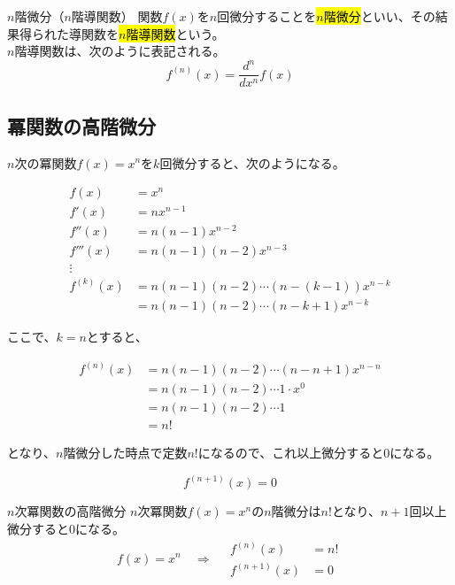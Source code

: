 \documentclass[../math-imaging]{subfiles}
\begin{document}
\begin{definition}{$n$階微分（$n$階導関数）}
  \newline
  関数$f(x)$を$n$回微分することを\hl{$n$階微分}といい、その結果得られた導関数を\hl{$n$階導関数}という。\\
  $n$階導関数は、次のように表記される。
  \LARGE
  \begin{equation}
    f^{(n)}(x) = \dfrac{d^n}{dx^n} f(x)
  \end{equation}
\end{definition}

\subsection{冪関数の高階微分}

$n$次の冪関数$f(x)=x^n$を$k$回微分すると、次のようになる。

\begin{align}
  f(x)       & = x^n                               \\
  f'(x)      & = nx^{n-1}                          \\
  f''(x)     & = n(n-1)x^{n-2}                     \\
  f'''(x)    & = n(n-1)(n-2)x^{n-3}                \\
  \vdots     &                                     \\
  f^{(k)}(x) & = n(n-1)(n-2)\cdots(n-(k-1))x^{n-k} \\
             & = n(n-1)(n-2)\cdots(n-k+1)x^{n-k}
\end{align}

ここで、$k=n$とすると、

\begin{align}
  f^{(n)}(x) & = n(n-1)(n-2)\cdots(n-n+1)x^{n-n} \\
             & = n(n-1)(n-2)\cdots 1 \cdot x^0   \\
             & = n(n-1)(n-2)\cdots 1             \\
             & = n!
\end{align}

となり、$n$階微分した時点で定数$n!$になるので、これ以上微分すると$0$になる。

\begin{equation}
  f^{(n+1)}(x) = 0
\end{equation}

\begin{theorem}{$n$次冪関数の高階微分}
  \newline
  $n$次冪関数$f(x) = x^n$の$n$階微分は$n!$となり、$n+1$回以上微分すると$0$になる。
  \LARGE
  \begin{equation}
    f(x) = x^n \quad \Longrightarrow \quad \begin{aligned}
      f^{(n)}(x)   & = n! \\
      f^{(n+1)}(x) & = 0
    \end{aligned}
  \end{equation}
\end{theorem}
\end{document}
